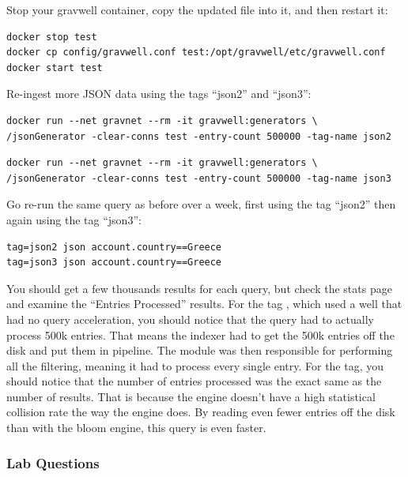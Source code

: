 {Stop your gravwell container, copy the updated  file
into it, and then restart it:

\begin{Verbatim}[breaklines=true]
docker stop test
docker cp config/gravwell.conf test:/opt/gravwell/etc/gravwell.conf
docker start test
\end{Verbatim}

Re-ingest more JSON data using the tags ``json2'' and
``json3'':}

\begin{Verbatim}[breaklines=true]
docker run --net gravnet --rm -it gravwell:generators \
/jsonGenerator -clear-conns test -entry-count 500000 -tag-name json2
\end{Verbatim}

\begin{Verbatim}[breaklines=true]
docker run --net gravnet --rm -it gravwell:generators \
/jsonGenerator -clear-conns test -entry-count 500000 -tag-name json3
\end{Verbatim}

Go re-run the same query as before over a week, first using the tag
``json2'' then again using the tag ``json3'':

\begin{Verbatim}[breaklines=true]
tag=json2 json account.country==Greece
tag=json3 json account.country==Greece
\end{Verbatim}

You should get a few thousands results for each query,  but check the stats page and examine the
``Entries Processed'' results. For the tag , which used a well
that had no query acceleration, you should notice that the query had to
actually process 500k entries. That means the indexer had to get the
500k entries off the disk and put them in pipeline. The \code{json} module
was then responsible for performing all the filtering, meaning it had to
process every single entry. For the \code{json2} tag, you should notice
that the number of entries processed was the exact same as the number of
results. That is because the \code{index} engine doesn't have a high
statistical collision rate the way the \code{bloom} engine does. By reading
even fewer entries off the disk than with the bloom engine, this query is even faster.

\subsubsection{Lab Questions}

